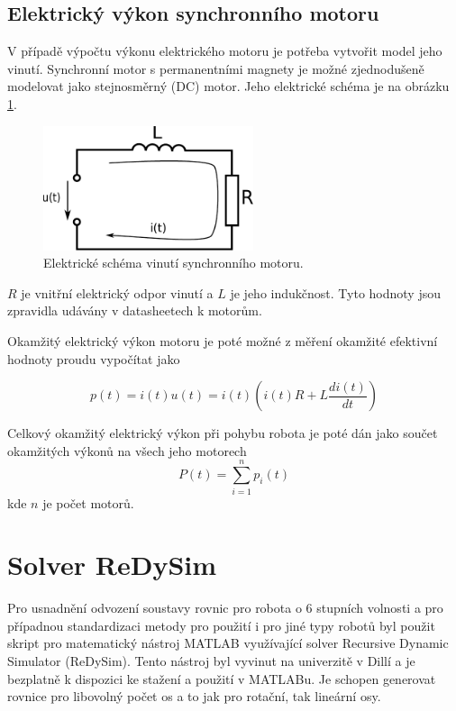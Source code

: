\subsection{Elektrický výkon synchronního motoru}

V případě výpočtu výkonu elektrického motoru je potřeba vytvořit model jeho vinutí. Synchronní motor s permanentními magnety je možné zjednodušeně modelovat jako stejnosměrný (DC) motor. Jeho elektrické schéma je na obrázku \ref{schema_motoru_pic}.  

\begin{figure}[ht]
\includegraphics[width=0.55\textwidth]{obvod_motoru}
\caption{Elektrické schéma vinutí synchronního motoru.}
\label{schema_motoru_pic}
\end{figure}

$R$ je vnitřní elektrický odpor vinutí a $L$ je jeho indukčnost. Tyto hodnoty jsou zpravidla udávány v datasheetech k motorům.

Okamžitý elektrický výkon motoru je poté možné z měření okamžité efektivní hodnoty proudu vypočítat jako
 
\begin{equation}
p(t) = i(t)u(t) = i(t)\left(i(t)R + L\frac{di(t)}{dt}\right)
\label{motor_power_eq}
\end{equation} 

Celkový okamžitý elektrický výkon při pohybu robota je poté dán jako součet okamžitých výkonů na všech jeho motorech
\begin{equation}
P(t) = \sum_{i=1}^{n} p_i(t)
\label{robot_motor_power_eq}
\end{equation} 
kde $n$ je počet motorů.

\section{Solver ReDySim}

Pro usnadnění odvození soustavy rovnic pro robota o 6 stupních volnosti a pro případnou standardizaci metody pro použití i pro jiné typy robotů byl použit skript pro matematický nástroj MATLAB využívající solver Recursive Dynamic Simulator (ReDySim)\cite{redysim}. Tento nástroj byl vyvinut na univerzitě v Dillí a je bezplatně k dispozici ke stažení a použití v MATLABu. Je schopen generovat rovnice pro libovolný počet os a to jak pro rotační, tak lineární osy. 

